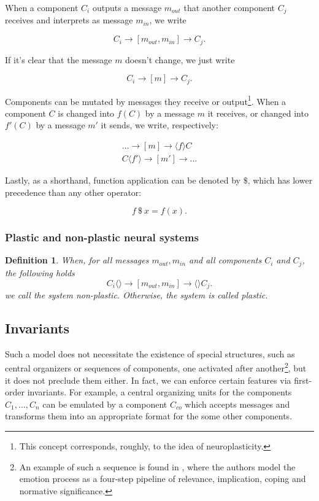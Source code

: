 \documentclass[]{scrartcl}
\newtheorem{definition}{Definition}
\begin{document}
When a component $C_i$ outputs a message $m_{out}$ that another component $C_j$ receives and interprets as message $m_{in}$, we write

\begin{equation}
	C_i \rightarrow [m_{out}, m_{in}] \rightarrow C_j.
\end{equation}

If it's clear that the message $m$ doesn't change, we just write

\begin{equation}
	C_i \rightarrow [m] \rightarrow C_j.
\end{equation}

Components can be mutated by messages they receive or output\footnote{This concept corresponds, roughly, to the idea of neuroplasticity.}. When a component $C$ is changed into $f(C)$ by a message $m$ it receives, or changed into $f'(C)$ by a message $m'$ it sends, we write, respectively:

\begin{eqnarray}
	\dots \rightarrow [m] \rightarrow \langle f \rangle C\\
	C\langle f'\rangle \rightarrow [m'] \rightarrow \dots
\end{eqnarray}

Lastly, as a shorthand, function application can be denoted by $\$$, which has lower precedence than any other operator:

\begin{equation}
	f\ \$\ x = f(x).
\end{equation}

\subsubsection{Plastic and non-plastic neural systems}

\begin{definition}
When, for all messages $m_{out}, m_{in}$ and all components $C_i$ and $C_j$, the following holds
$$
	C_i\langle\rangle \rightarrow [m_{out}, m_{in}] \rightarrow \langle\rangle C_j.
$$
we call the system {\em non-plastic}. Otherwise, the system is called {\em plastic}.
\end{definition}

\subsection{Invariants}

Such a model does not necessitate the existence of special structures, such as central organizers or sequences of components, one activated after another\footnote{An example of such a sequence is found in \cite{DBLP:journals/nn/SanderGS05}, where the authors model the emotion process as a four-step pipeline of relevance, implication, coping and normative significance.}, but it does not preclude them either. In fact, we can enforce certain features via first-order invariants. For example, a central organizing units for the components $C_1,\dots,C_n$ can be emulated by a component $C_{co}$ which accepts messages and transforms them into an appropriate format for the some other components.
\end{document}
